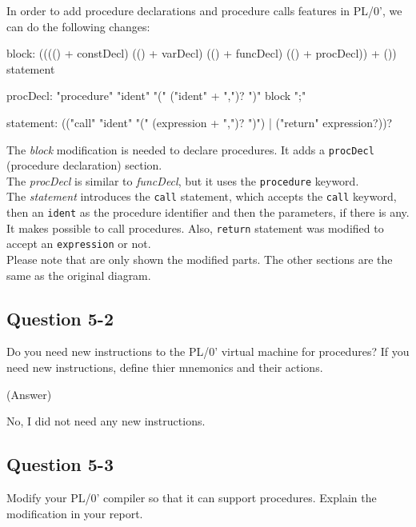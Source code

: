 \documentclass{article}
\begin{document}
In order to add procedure declarations and procedure calls features in PL/0',
we can do the following changes:\\

\begin{rail}
    block: (((() + constDecl)
             (() + varDecl)
             (() + funcDecl)
             (() + procDecl)) +
    ()) statement
\end{rail}

\begin{rail}
    procDecl: "procedure" "ident" "(" ("ident" + ",")? ")" block ";"
\end{rail}

\begin{rail}
    statement: (("call" "ident" "(" (expression + ",")? ")")
             | ("return" expression?))?
\end{rail}

The \emph{block} modification is needed to declare procedures. It adds a
{\tt procDecl} (procedure declaration) section.\\
The \emph{procDecl} is similar to \emph{funcDecl}, but it uses the
{\tt procedure} keyword.\\
The \emph{statement} introduces the {\tt call} statement, which accepts the
{\tt call} keyword, then an {\tt ident} as the procedure identifier and then
the parameters, if there is any. It makes possible to call procedures.
Also, {\tt return} statement was modified to accept an {\tt expression} or
not.\\
Please note that are only shown the modified parts.
The other sections are the same as the original diagram.\\

\subsection*{Question 5-2}
Do you need new instructions to the PL/0' virtual machine for procedures?
If you need new instructions, define thier mnemonics and their actions. 

\ifreport
(Answer)\\
\fi

No, I did not need any new instructions.

\subsection*{Question 5-3}
Modify your PL/0' compiler so that it can support procedures.
Explain the modification in your report.
\end{document}
